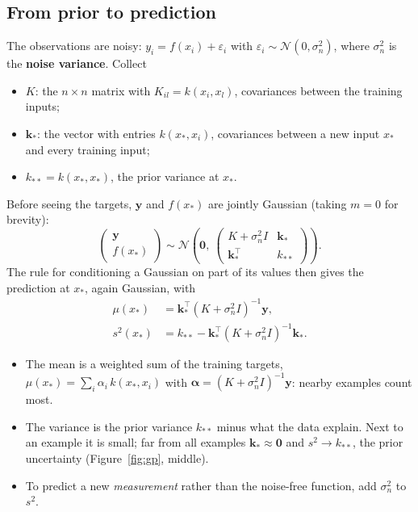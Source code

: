 \documentclass[11pt]{article}
\newcommand{\N}{\mathcal{N}}
\begin{document}
\subsection{From prior to prediction}
The observations are noisy: $y_i = f(x_i) + \varepsilon_i$ with $\varepsilon_i \sim \N(0, \sigma_n^2)$, where $\sigma_n^2$ is the
\textbf{noise variance}. Collect
\begin{itemize}
\item $K$: the $n\times n$ matrix with $K_{il} = k(x_i, x_l)$, covariances between the training inputs;
\item $\bm k_*$: the vector with entries $k(x_*, x_i)$, covariances between a new input $x_*$ and every training input;
\item $k_{**} = k(x_*, x_*)$, the prior variance at $x_*$.
\end{itemize}
Before seeing the targets, $\bm y$ and $f(x_*)$ are jointly Gaussian (taking $m = 0$ for brevity):
\begin{equation}
\begin{pmatrix}\bm y\\ f(x_*)\end{pmatrix} \sim \N\!\left(\bm 0,\ \begin{pmatrix}K + \sigma_n^2 I & \bm k_*\\ \bm k_*^\top & k_{**}\end{pmatrix}\right).
\end{equation}
The rule for conditioning a Gaussian on part of its values then gives the prediction at $x_*$, again Gaussian, with
\begin{align}
\mu(x_*) &= \bm k_*^\top (K + \sigma_n^2 I)^{-1}\bm y , \label{eq:gpmean}\\
s^2(x_*) &= k_{**} - \bm k_*^\top (K + \sigma_n^2 I)^{-1}\bm k_* . \label{eq:gpvar}
\end{align}
\begin{itemize}
\item The mean is a weighted sum of the training targets, $\mu(x_*) = \sum_i \alpha_i\,k(x_*, x_i)$ with
  $\bm\alpha = (K + \sigma_n^2 I)^{-1}\bm y$: nearby examples count most.
\item The variance is the prior variance $k_{**}$ minus what the data explain. Next to an example it is small; far from all examples
  $\bm k_* \approx \bm 0$ and $s^2 \to k_{**}$, the prior uncertainty (Figure~\ref{fig:gp}, middle).
\item To predict a new \emph{measurement} rather than the noise-free function, add $\sigma_n^2$ to $s^2$.
\end{itemize}
\end{document}
